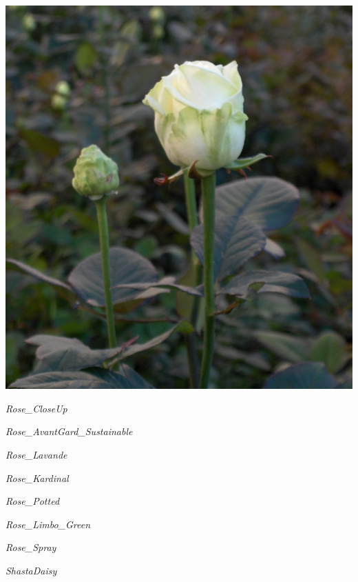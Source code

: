 \documentclass{article}
\begin{document}
\begin{center}
\includegraphics[width=0.9\textheight, angle=90]{../Rose_Akito.jpg}
\end{center}
\newpage

\noindent   
\vfill
\centerline{{\Large\emph{Rose_CloseUp}}}
\vfill
\newpage

\noindent   
\vfill
\centerline{{\Large\emph{Rose_AvantGard_Sustainable}}}
\vfill
\newpage

\noindent   
\vfill
\centerline{{\Large\emph{Rose_Lavande}}}
\vfill
\newpage

\noindent   
\vfill
\centerline{{\Large\emph{Rose_Kardinal}}}
\vfill
\newpage

\noindent   
\vfill
\centerline{{\Large\emph{Rose_Potted}}}
\vfill
\newpage

\noindent   
\vfill
\centerline{{\Large\emph{Rose_Limbo_Green}}}
\vfill
\newpage

\noindent   
\vfill
\centerline{{\Large\emph{Rose_Spray}}}
\vfill
\newpage

\noindent   
\vfill
\centerline{{\Large\emph{ShastaDaisy}}}
\vfill
\newpage
\end{document}
